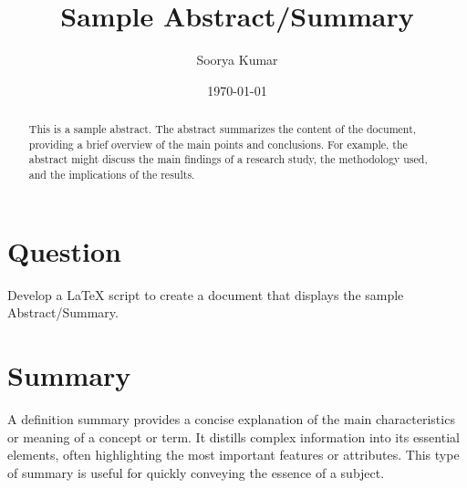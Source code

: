 \documentclass[12pt,a4paper]{article}
\title{\LARGE \textbf{Sample Abstract/Summary}}
\author{Soorya Kumar}
\date{\today}
\begin{document}
	\maketitle

	\section*{Question}
		{\large Develop a LaTeX script to create a document that displays the sample Abstract/Summary.}
	\begin{abstract}
		This is a sample abstract. The abstract summarizes the content of the document, providing a brief overview of the main points and conclusions. For example, the abstract might discuss the main findings of a research study, the methodology used, and the implications of the results.
	\end{abstract}
		
	\section*{Summary}
		A definition summary provides a concise explanation of the main characteristics or meaning of a concept or term. It distills complex information into its essential elements, often highlighting the most important features or attributes. This type of summary is useful for quickly conveying the essence of a subject.
\end{document}

